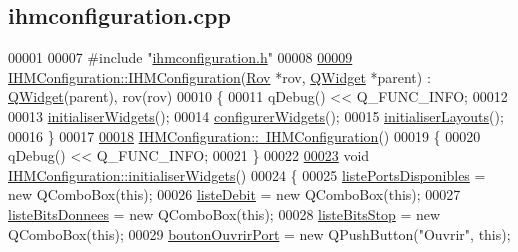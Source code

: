 \hypertarget{ihmconfiguration_8cpp_source}{}\subsection{ihmconfiguration.\+cpp}
\label{ihmconfiguration_8cpp_source}

\begin{DoxyCode}
00001 
00007 \textcolor{preprocessor}{#include "\hyperlink{ihmconfiguration_8h}{ihmconfiguration.h}"}
00008 
\hyperlink{class_i_h_m_configuration_a1532c281d170546071352cfe05feb1b8}{00009} \hyperlink{class_i_h_m_configuration_a1532c281d170546071352cfe05feb1b8}{IHMConfiguration::IHMConfiguration}(\hyperlink{class_rov}{Rov} *rov, 
      \hyperlink{class_q_widget}{QWidget} *parent) : \hyperlink{class_q_widget}{QWidget}(parent), rov(rov)
00010 \{
00011     qDebug() << Q\_FUNC\_INFO;
00012 
00013     \hyperlink{class_i_h_m_configuration_a76fe56bbd88aef5581186e05fb4ae67f}{initialiserWidgets}();
00014     \hyperlink{class_i_h_m_configuration_a9ed73ca9584b8d9f33ad341081113a55}{configurerWidgets}();
00015     \hyperlink{class_i_h_m_configuration_ab76abe78fff3b7945b675acddbd320f0}{initialiserLayouts}();
00016 \}
00017 
\hyperlink{class_i_h_m_configuration_a59e2b693b4a1f1a8a6af3227996c3808}{00018} \hyperlink{class_i_h_m_configuration_a59e2b693b4a1f1a8a6af3227996c3808}{IHMConfiguration::~IHMConfiguration}()
00019 \{
00020     qDebug() << Q\_FUNC\_INFO;
00021 \}
00022 
\hyperlink{class_i_h_m_configuration_a76fe56bbd88aef5581186e05fb4ae67f}{00023} \textcolor{keywordtype}{void} \hyperlink{class_i_h_m_configuration_a76fe56bbd88aef5581186e05fb4ae67f}{IHMConfiguration::initialiserWidgets}()
00024 \{
00025     \hyperlink{class_i_h_m_configuration_af3ce74444e24237aedf1d2ef2053b574}{listePortsDisponibles} = \textcolor{keyword}{new} QComboBox(\textcolor{keyword}{this});
00026     \hyperlink{class_i_h_m_configuration_a98e8133a04509b3a80b232d2f031e81f}{listeDebit} = \textcolor{keyword}{new} QComboBox(\textcolor{keyword}{this});
00027     \hyperlink{class_i_h_m_configuration_a83c61d075d53758bd753aada9a0bb452}{listeBitsDonnees} = \textcolor{keyword}{new} QComboBox(\textcolor{keyword}{this});
00028     \hyperlink{class_i_h_m_configuration_a16ae724388b797983c78e87e7d5485cb}{listeBitsStop} = \textcolor{keyword}{new} QComboBox(\textcolor{keyword}{this});
00029     \hyperlink{class_i_h_m_configuration_a824b7f6c0d332b8f6f76801e545b14ad}{boutonOuvrirPort} = \textcolor{keyword}{new} QPushButton(\textcolor{stringliteral}{"Ouvrir"}, \textcolor{keyword}{this});

\end{DoxyCode}
